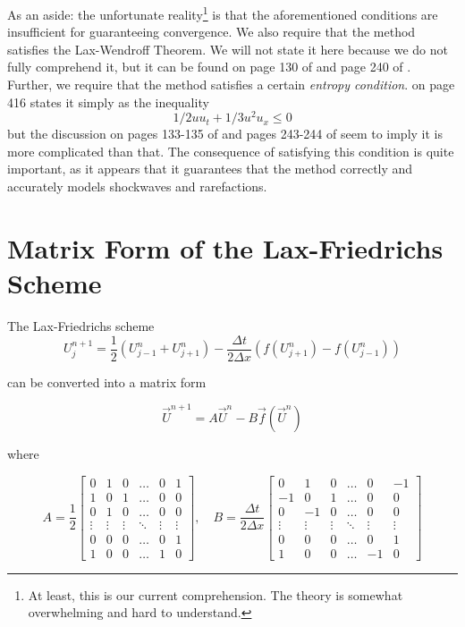 \documentclass{myproject}
\begin{document}
As an aside: the unfortunate reality\footnote{At least, this is our current comprehension. The theory is somewhat overwhelming and hard to understand.} is that the aforementioned conditions are insufficient for guaranteeing convergence. We also require that the method satisfies the Lax-Wendroff Theorem. We will not state it here because we do not fully comprehend it, but it can be found on page 130 of \cite{leveque1992} and page 240 of \cite{leveque2002}. Further, we require that the method satisfies a certain \emph{entropy condition}. \cite{iserles2009} on page 416 states it simply as the inequality
\[
    1/2 uu_t + 1/3 u^2u_x \leq 0
\]
but the discussion on pages 133-135 of \cite{leveque1992} and pages 243-244 of \cite{leveque2002} seem to imply it is more complicated than that. The consequence of satisfying this condition is quite important, as it appears that it guarantees that the method correctly and accurately models shockwaves and rarefactions.

\section{Matrix Form of the Lax-Friedrichs Scheme}
The Lax-Friedrichs scheme
\[
    U_j^{n+1} = \frac{1}{2}\left( U_{j-1}^{n} + U_{j+1}^{n} \right) - \frac{\Delta t}{2\Delta x}\left( f(U_{j+1}^{n}) - f(U_{j-1}^{n}) \right)
\]

can be converted into a matrix form

\[
\vec{U}^{n+1} = A\vec{U}^{n} - B\vec{f}(\vec{U}^{n})
\]

where

\[
A = \frac{1}{2}
\begin{bmatrix}
0 & 1 & 0 & \dots & 0 & 1 \\
1 & 0 & 1 & \dots & 0 & 0 \\
0 & 1 & 0 & \dots & 0 & 0 \\
\vdots & \vdots & \vdots & \ddots & \vdots & \vdots \\
0 & 0 & 0 & \dots & 0 & 1 \\
1 & 0 & 0 & \dots & 1 & 0
\end{bmatrix},
\quad
B = \frac{\Delta t}{2 \Delta x}
\begin{bmatrix}
0 & 1 & 0 & \dots & 0 & -1 \\
-1 & 0 & 1 & \dots & 0 & 0 \\
0 & -1 & 0 & \dots & 0 & 0 \\
\vdots & \vdots & \vdots & \ddots & \vdots & \vdots \\
0 & 0 & 0 & \dots & 0 & 1 \\
1 & 0 & 0 & \dots & -1 & 0
\end{bmatrix}
\]
\end{document}
